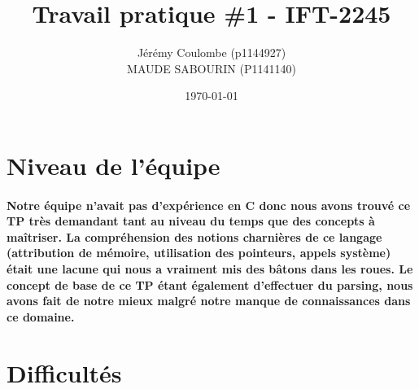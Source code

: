 \documentclass{article}
\begin{document}
\title{Travail pratique \#1 - IFT-2245} 

\author{Jérémy Coulombe (p1144927) \\ MAUDE SABOURIN (P1141140)}
\date{\today}

\begin{titlingpage}
\maketitle

\end{titlingpage}







\section{Niveau de l’équipe}

\paragraph{Notre équipe n’avait pas d’expérience en C donc nous avons trouvé ce TP très demandant tant au niveau du temps que des concepts à maîtriser. La compréhension des notions charnières de ce langage (attribution de mémoire, utilisation des pointeurs, appels système) était une lacune qui nous a vraiment mis des bâtons dans les roues. Le concept de base de ce TP étant également d’effectuer du parsing, nous avons fait de notre mieux malgré notre manque de connaissances dans ce domaine.}

\section{Difficultés}
\end{document}
